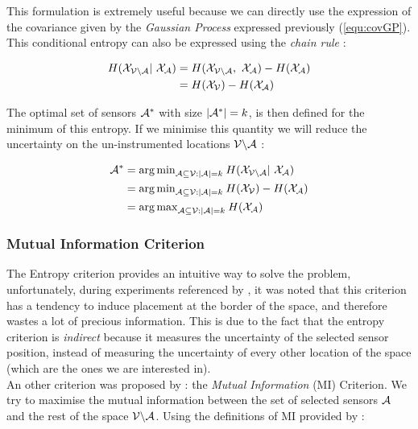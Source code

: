 This formulation is extremely useful because we can directly use the expression of the covariance given by the \textit{Gaussian Process} expressed previously (\ref{equ:covGP}). \\


This conditional entropy can also be expressed using the \textit{chain rule}  \citep[p.~16]{cover_elements_1991} : 

\begin{align}
    H(\X_{\VA} | \X_\A) &= H(\X_{\VA} ,  \X_\A) -  H(\X_{\A}) \\
    &= H(\X_{\V}) -  H(\X_{\A}) 
\label{equ:chainentropy}
\end{align}

The optimal set of sensors $\mathcal{A}^*$ with size $|\mathcal{A}^*| = k$, is then defined for the minimum of this entropy. If we minimise this quantity we will reduce the uncertainty on the un-instrumented locations $\mathcal{V} \backslash\mathcal{A}$ : 

\begin{align}
    \A^* &= {\arg\min}_{\A \subseteq \V : |\A| = k } \: H(\X_{\VA} | \X_\A) \\
     &= {\arg\min}_{\A \subseteq \V : |\A| = k }\:  H(\X_\V) -  H(\X_{\A}) \\
     &= {\arg\max}_{\A \subseteq \V : |\A| = k }\:  H(\X_{\A}) 
\end{align}


\subsubsection{Mutual Information Criterion}

The Entropy criterion provides an intuitive way to solve the problem, unfortunately, during experiments referenced by \citet{krause_near-optimal_2008}, it was noted that this criterion has a tendency to induce placement at the border of the space, and therefore wastes a lot of precious information. This is due to the fact that the entropy criterion is \textit{indirect} because it measures the uncertainty of the selected sensor position, instead of measuring the uncertainty of every other location of the space (which are the ones we are interested in). \\

An other criterion was proposed by \citet{caselton_optimal_1984} : the \textit{Mutual Information} (MI) Criterion. We try to maximise the mutual information between the set of selected sensors $\mathcal{A}$ and the rest of the space $\mathcal{V} \backslash\mathcal{A}$. Using the definitions of MI provided by \citet[p.~19]{cover_elements_1991} : 

